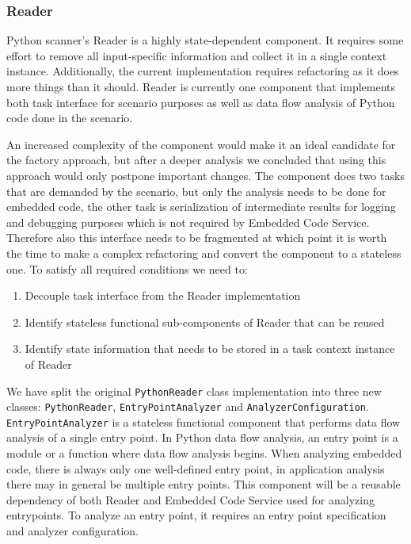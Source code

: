 \subsubsection{Reader}
Python scanner's Reader is a highly state-dependent component. It requires some effort to remove all input-specific information and collect it in a single context instance. Additionally, the current implementation requires refactoring as it does more things than it should. Reader is currently one component that implements both task interface for scenario purposes as well as data flow analysis of Python code done in the scenario.
\par
An increased complexity of the component would make it an ideal candidate for the factory approach, but after a deeper analysis we concluded that using this approach would only postpone important changes. The component does two tasks that are demanded by the scenario, but only the analysis needs to be done for embedded code, the other task is serialization of intermediate results for logging and debugging purposes which is not required by Embedded Code Service. Therefore also this interface needs to be fragmented at which point it is worth the time to make a complex refactoring and convert the component to a stateless one. To satisfy all required conditions we need to:
\begin{enumerate}
    \item Decouple task interface from the Reader implementation
    \item Identify stateless functional sub-components of Reader that can be reused 
    \item Identify state information that needs to be stored in a task context instance of Reader
\end{enumerate}
\par
We have split the original \texttt{PythonReader} class implementation into three new classes: \texttt{PythonReader}, \texttt{EntryPointAnalyzer} and \texttt{AnalyzerConfiguration}. \texttt{EntryPointAnalyzer} is a stateless functional component that performs data flow analysis of a single entry point. In Python data flow analysis, an entry point is a module or a function where data flow analysis begins. When analyzing embedded code, there is always only one well-defined entry point, in application analysis there may in general be multiple entry points. This component will be a reusable dependency of both Reader and Embedded Code Service used for analyzing entrypoints. To analyze an entry point, it requires an entry point specification and analyzer configuration.
